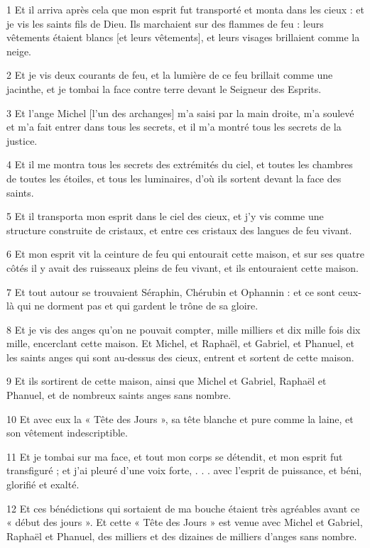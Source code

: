 \par 1 Et il arriva après cela que mon esprit fut transporté et monta dans les cieux : et je vis les saints fils de Dieu. Ils marchaient sur des flammes de feu : leurs vêtements étaient blancs [et leurs vêtements], et leurs visages brillaient comme la neige.
\par 2 Et je vis deux courants de feu, et la lumière de ce feu brillait comme une jacinthe, et je tombai la face contre terre devant le Seigneur des Esprits.
\par 3 Et l'ange Michel [l'un des archanges] m'a saisi par la main droite, m'a soulevé et m'a fait entrer dans tous les secrets, et il m'a montré tous les secrets de la justice.
\par 4 Et il me montra tous les secrets des extrémités du ciel, et toutes les chambres de toutes les étoiles, et tous les luminaires, d'où ils sortent devant la face des saints.
\par 5 Et il transporta mon esprit dans le ciel des cieux, et j'y vis comme une structure construite de cristaux, et entre ces cristaux des langues de feu vivant.
\par 6 Et mon esprit vit la ceinture de feu qui entourait cette maison, et sur ses quatre côtés il y avait des ruisseaux pleins de feu vivant, et ils entouraient cette maison.
\par 7 Et tout autour se trouvaient Séraphin, Chérubin et Ophannin : et ce sont ceux-là qui ne dorment pas et qui gardent le trône de sa gloire.
\par 8 Et je vis des anges qu'on ne pouvait compter, mille milliers et dix mille fois dix mille, encerclant cette maison. Et Michel, et Raphaël, et Gabriel, et Phanuel, et les saints anges qui sont au-dessus des cieux, entrent et sortent de cette maison.
\par 9 Et ils sortirent de cette maison, ainsi que Michel et Gabriel, Raphaël et Phanuel, et de nombreux saints anges sans nombre.
\par 10 Et avec eux la « Tête des Jours », sa tête blanche et pure comme la laine, et son vêtement indescriptible.
\par 11 Et je tombai sur ma face, et tout mon corps se détendit, et mon esprit fut transfiguré ; et j'ai pleuré d'une voix forte, . . . avec l'esprit de puissance, et béni, glorifié et exalté.
\par 12 Et ces bénédictions qui sortaient de ma bouche étaient très agréables avant ce « début des jours ». Et cette « Tête des Jours » est venue avec Michel et Gabriel, Raphaël et Phanuel, des milliers et des dizaines de milliers d'anges sans nombre.

